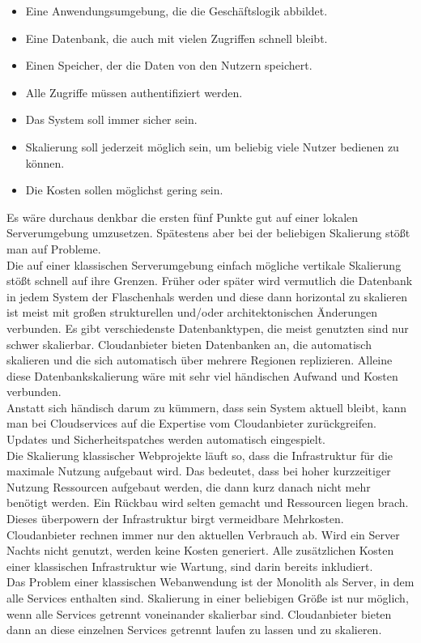 \documentclass[a4paper, 12pt]{scrreprt}
\renewcommand\_{\textunderscore\allowbreak}
\begin{document}
\begin{itemize}
\item Eine Anwendungsumgebung, die die Geschäftslogik abbildet.
\item Eine Datenbank, die auch mit vielen Zugriffen schnell bleibt.
\item Einen Speicher, der die Daten von den Nutzern speichert.
\item Alle Zugriffe müssen authentifiziert werden.
\item Das System soll immer sicher sein.
\item Skalierung soll jederzeit möglich sein, um beliebig viele Nutzer bedienen zu können.
\item Die Kosten sollen möglichst gering sein.
\end{itemize}
Es wäre durchaus denkbar die ersten fünf Punkte gut auf einer lokalen Serverumgebung umzusetzen. Spätestens aber bei der beliebigen Skalierung stößt man auf Probleme. 
\\
Die auf einer klassischen Serverumgebung einfach mögliche vertikale Skalierung stößt schnell auf ihre Grenzen. Früher oder später wird vermutlich die Datenbank in jedem System der Flaschenhals werden und diese dann horizontal zu skalieren ist meist mit großen strukturellen und/oder architektonischen Änderungen verbunden. Es gibt verschiedenste Datenbanktypen, die meist genutzten sind nur schwer skalierbar. Cloudanbieter bieten Datenbanken an, die automatisch skalieren und die sich automatisch über mehrere Regionen replizieren. Alleine diese Datenbankskalierung wäre mit sehr viel händischen Aufwand und Kosten verbunden. \\ 
Anstatt sich händisch darum zu kümmern, dass sein System aktuell bleibt, kann man bei Cloudservices auf die Expertise vom Cloudanbieter zurückgreifen. Updates und Sicherheitspatches werden automatisch eingespielt. \\
Die Skalierung klassischer Webprojekte läuft so, dass die Infrastruktur für die maximale Nutzung aufgebaut wird. Das bedeutet, dass bei hoher kurzzeitiger Nutzung Ressourcen aufgebaut werden, die dann kurz danach nicht mehr benötigt werden. Ein Rückbau wird selten gemacht und Ressourcen liegen brach. Dieses überpowern der Infrastruktur birgt vermeidbare Mehrkosten. Cloudanbieter rechnen immer nur den aktuellen Verbrauch ab. Wird ein Server Nachts nicht genutzt, werden keine Kosten generiert. Alle zusätzlichen Kosten einer klassischen Infrastruktur wie Wartung, sind darin bereits inkludiert. \\
Das Problem einer klassischen Webanwendung ist der Monolith als Server, in dem alle Services enthalten sind. Skalierung in einer beliebigen Größe ist nur möglich, wenn alle Services getrennt voneinander skalierbar sind. Cloudanbieter bieten dann an diese einzelnen Services getrennt laufen zu lassen und zu skalieren. \\
\end{document}
